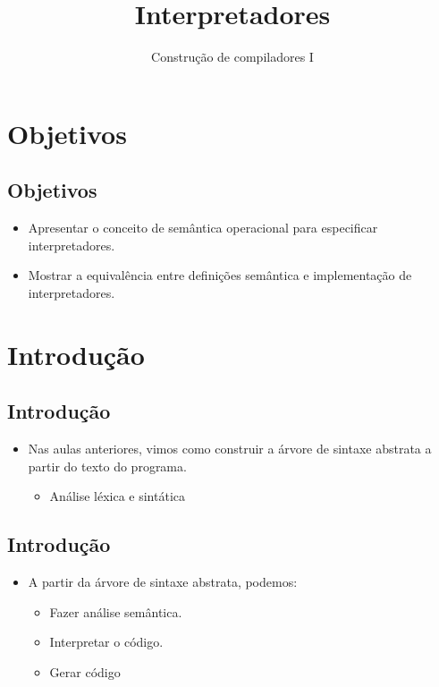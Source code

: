 \documentclass[11pt]{article}
\author{Construção de compiladores I}
\date{}
\title{Interpretadores}
\begin{document}
\maketitle
\section*{Objetivos}
\label{sec:org5383b56}

\subsection*{Objetivos}
\label{sec:org54f5c16}

\begin{itemize}
\item Apresentar o conceito de semântica operacional para especificar interpretadores.

\item Mostrar a equivalência entre definições semântica e implementação de interpretadores.
\end{itemize}
\section*{Introdução}
\label{sec:org3732cf4}

\subsection*{Introdução}
\label{sec:orgad9eedc}

\begin{itemize}
\item Nas aulas anteriores, vimos como construir a árvore de sintaxe abstrata a partir do texto do programa.
\begin{itemize}
\item Análise léxica e sintática
\end{itemize}
\end{itemize}
\subsection*{Introdução}
\label{sec:org46c8c3d}

\begin{itemize}
\item A partir da árvore de sintaxe abstrata, podemos:
\begin{itemize}
\item Fazer análise semântica.
\item Interpretar o código.
\item Gerar código
\end{itemize}
\end{itemize}
\end{document}
